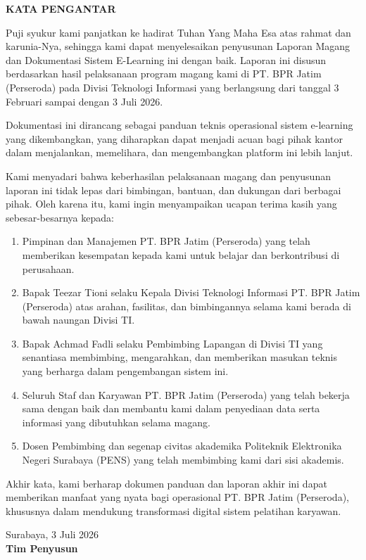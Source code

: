 \begin{center}
    {\fontsize{12pt}{14.4pt}\selectfont\textbf{KATA PENGANTAR}\par}
    \vspace{0.5cm}
\end{center}

Puji syukur kami panjatkan ke hadirat Tuhan Yang Maha Esa atas rahmat dan karunia-Nya, sehingga kami dapat menyelesaikan penyusunan Laporan Magang dan Dokumentasi Sistem E-Learning ini dengan baik. Laporan ini disusun berdasarkan hasil pelaksanaan program magang kami di PT. BPR Jatim (Perseroda) pada Divisi Teknologi Informasi yang berlangsung dari tanggal 3 Februari sampai dengan 3 Juli 2026.

Dokumentasi ini dirancang sebagai panduan teknis operasional sistem e-learning yang dikembangkan, yang diharapkan dapat menjadi acuan bagi pihak kantor dalam menjalankan, memelihara, dan mengembangkan platform ini lebih lanjut.

Kami menyadari bahwa keberhasilan pelaksanaan magang dan penyusunan laporan ini tidak lepas dari bimbingan, bantuan, dan dukungan dari berbagai pihak. Oleh karena itu, kami ingin menyampaikan ucapan terima kasih yang sebesar-besarnya kepada:
\begin{enumerate}[label=\arabic*., leftmargin=*, noitemsep, topsep=6pt, parsep=0pt, itemsep=6pt]
    \item Pimpinan dan Manajemen PT. BPR Jatim (Perseroda) yang telah memberikan kesempatan kepada kami untuk belajar dan berkontribusi di perusahaan.
    \item Bapak Teezar Tioni selaku Kepala Divisi Teknologi Informasi PT. BPR Jatim (Perseroda) atas arahan, fasilitas, dan bimbingannya selama kami berada di bawah naungan Divisi TI.
    \item Bapak Achmad Fadli selaku Pembimbing Lapangan di Divisi TI yang senantiasa membimbing, mengarahkan, dan memberikan masukan teknis yang berharga dalam pengembangan sistem ini.
    \item Seluruh Staf dan Karyawan PT. BPR Jatim (Perseroda) yang telah bekerja sama dengan baik dan membantu kami dalam penyediaan data serta informasi yang dibutuhkan selama magang.
    \item Dosen Pembimbing dan segenap civitas akademika Politeknik Elektronika Negeri Surabaya (PENS) yang telah membimbing kami dari sisi akademis.
\end{enumerate}

Akhir kata, kami berharap dokumen panduan dan laporan akhir ini dapat memberikan manfaat yang nyata bagi operasional PT. BPR Jatim (Perseroda), khususnya dalam mendukung transformasi digital sistem pelatihan karyawan.

\vspace{0.8cm}
\begin{flushright}
Surabaya, 3 Juli 2026\\[1.6cm]
\textbf{Tim Penyusun}
\end{flushright}
\newpage

